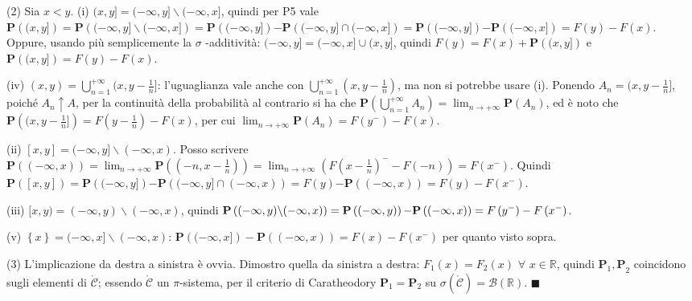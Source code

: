 \documentclass{article}
\begin{document}
(2) Sia $x<y$. (i) $(x,y]=(-\infty ,y]\backslash (-\infty ,x]$, quindi per
P5 vale $\mathbf{P}\left( (x,y]\right) =\mathbf{P}\left( (-\infty
,y]\backslash (-\infty ,x]\right) =\mathbf{P}\left( (-\infty ,y]\right) 
\mathbf{-P}\left( (-\infty ,y]\cap (-\infty ,x]\right) =\mathbf{P}\left(
(-\infty ,y]\right) \mathbf{-P}\left( (-\infty ,x]\right) =F\left( y\right)
-F\left( x\right) $. Oppure, usando pi\`{u} semplicemente la $\sigma $%
-additivit\`{a}: $(-\infty ,y]=(-\infty ,x]\cup (x,y]$, quindi $F\left(
y\right) =F\left( x\right) +\mathbf{P}\left( (x,y]\right) $ e $\mathbf{P}%
\left( (x,y]\right) =F\left( y\right) -F\left( x\right) $.

(iv) $\left( x,y\right) =\bigcup_{n=1}^{+\infty }(x,y-\frac{1}{n}]$:
l'uguaglianza vale anche con $\bigcup_{n=1}^{+\infty }(x,y-\frac{1}{n})$, ma
non si potrebbe usare (i). Ponendo $A_{n}=(x,y-\frac{1}{n}]$, poich\'{e} $%
A_{n}\uparrow A$, per la continuit\`{a} della probabilit\`{a} al contrario
si ha che $\mathbf{P}\left( \bigcup_{n=1}^{+\infty }A_{n}\right)
=\lim_{n\rightarrow +\infty }\mathbf{P}\left( A_{n}\right) $, ed \`{e} noto
che $\mathbf{P}\left( (x,y-\frac{1}{n}]\right) =F\left( y-\frac{1}{n}\right)
-F\left( x\right) $, per cui $\lim_{n\rightarrow +\infty }\mathbf{P}\left(
A_{n}\right) =F\left( y^{-}\right) -F\left( x\right) $.

(ii) $[x,y]=(-\infty ,y]\backslash \left( -\infty ,x\right) $. Posso
scrivere $\mathbf{P}\left( \left( -\infty ,x\right) \right)
=\lim_{n\rightarrow +\infty }\mathbf{P}\left( \left( -n,x-\frac{1}{n}\right)
\right) =\lim_{n\rightarrow +\infty }\left( F\left( x-\frac{1}{n}\right)
^{-}-F\left( -n\right) \right) =F\left( x^{-}\right) $. Quindi $\mathbf{P}%
\left( \left[ x,y\right] \right) =\mathbf{P}\left( (-\infty ,y]\right) 
\mathbf{-P}\left( (-\infty ,y]\cap (-\infty ,x)\right) =F\left( y\right) 
\mathbf{-P}\left( (-\infty ,x)\right) =F\left( y\right) -F\left(
x^{-}\right) $.

(iii) $[x,y)=\left( -\infty ,y\right) \backslash \left( -\infty ,x\right) $,
quindi $\mathbf{P}\left( (-\infty ,y)\backslash (-\infty ,x)\right) =\mathbf{%
P}\left( (-\infty ,y)\right) \mathbf{-P}\left( (-\infty ,x)\right) =F\left(
y^{-}\right) -F\left( x^{-}\right) $.

(v) $\left\{ x\right\} =(-\infty ,x]\backslash \left( -\infty ,x\right) $: $%
\mathbf{P}\left( (-\infty ,x]\right) -\mathbf{P}\left( \left( -\infty
,x\right) \right) =F\left( x\right) -F\left( x^{-}\right) $ per quanto visto
sopra.

(3) L'implicazione da destra a sinistra \`{e} ovvia. Dimostro quella da
sinistra a destra: $F_{1}\left( x\right) =F_{2}\left( x\right) $ $\forall $ $%
x\in 
\mathbb{R}
$, quindi $\mathbf{P}_{1}\mathbf{,P}_{2}$ coincidono sugli elementi di $%
\mathcal{\mathring{C}}$; essendo $\mathcal{\mathring{C}}$ un $\pi $-sistema,
per il criterio di Caratheodory $\mathbf{P}_{1}\mathbf{=P}_{2}$ su $\sigma
\left( \mathcal{\mathring{C}}\right) =\mathcal{B}\left( 
\mathbb{R}
\right) $. $\blacksquare $
\end{document}
